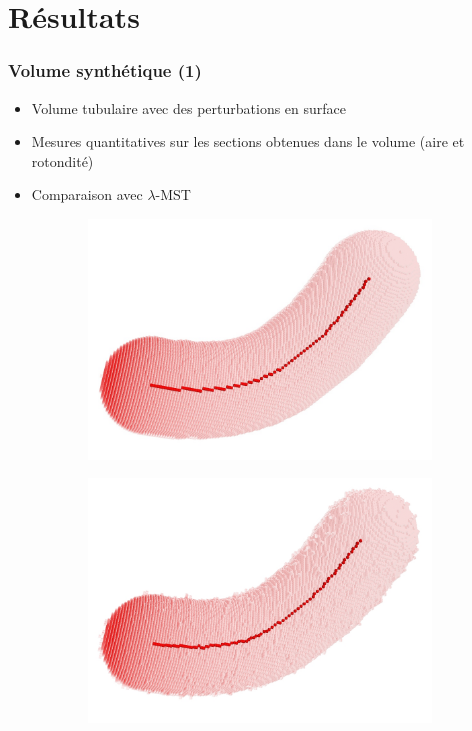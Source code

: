 \documentclass{beamer}
\begin{document}
\section{Résultats}
\begin{frame}
	\frametitle{Volume synthétique (1)}
	
		
			\begin{itemize}
				\item Volume tubulaire avec des perturbations en surface 
				\item Mesures quantitatives sur les sections obtenues dans le volume (aire et rotondité)
				\item Comparaison avec $\lambda$-MST
			\end{itemize}
				
			\begin{figure}[H]
				\centering
				\begin{subfigure}[t]{0.45\textwidth}
					\includegraphics[width=\textwidth]{fig/boudin.png}
					\caption{}
					\label{fig:boudinnoisy}
				\end{subfigure}%
				\begin{subfigure}[t]{0.45\textwidth}
					\includegraphics[width=\textwidth]{fig/boudinbruite.png}
					\caption{}
					\label{fig:thskeleton}
				\end{subfigure}
			\end{figure}		
\end{frame}
\end{document}

